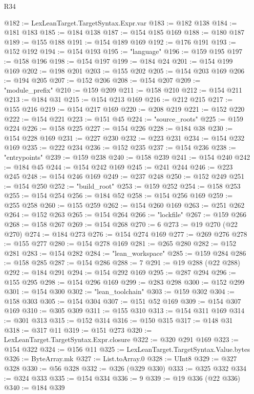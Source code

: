 \begin{lexlean}{R34}
\begin{coremodule}
@182 := LexLeanTarget.TargetSyntax.Expr.var
@183 := @182 @138
@184 := @181 @183
@185 := @184 @138
@187 := @154 @185 @169
@188 := @180 @187
@189 := @155 @188
@191 := @154 @189 @169
@192 := @176 @191
@193 := @152 @192
@194 := @154 @193
@195 := "language"
@196 := @159 @195
@197 := @158 @196
@198 := @154 @197
@199 := @184 @24
@201 := @154 @199 @169
@202 := @198 @201
@203 := @155 @202
@205 := @154 @203 @169
@206 := @194 @205
@207 := @152 @206
@208 := @154 @207
@209 := "module_prefix"
@210 := @159 @209
@211 := @158 @210
@212 := @154 @211
@213 := @184 @31
@215 := @154 @213 @169
@216 := @212 @215
@217 := @155 @216
@219 := @154 @217 @169
@220 := @208 @219
@221 := @152 @220
@222 := @154 @221
@223 := @151 @45
@224 := "source_roots"
@225 := @159 @224
@226 := @158 @225
@227 := @154 @226
@228 := @184 @38
@230 := @154 @228 @169
@231 := @227 @230
@232 := @223 @231
@234 := @154 @232 @169
@235 := @222 @234
@236 := @152 @235
@237 := @154 @236
@238 := "entrypoints"
@239 := @159 @238
@240 := @158 @239
@241 := @154 @240
@242 := @184 @45
@244 := @154 @242 @169
@245 := @241 @244
@246 := @223 @245
@248 := @154 @246 @169
@249 := @237 @248
@250 := @152 @249
@251 := @154 @250
@252 := "build_root"
@253 := @159 @252
@254 := @158 @253
@255 := @154 @254
@256 := @184 @52
@258 := @154 @256 @169
@259 := @255 @258
@260 := @155 @259
@262 := @154 @260 @169
@263 := @251 @262
@264 := @152 @263
@265 := @154 @264
@266 := "lockfile"
@267 := @159 @266
@268 := @158 @267
@269 := @154 @268
@270 := 6
@273 := @19 @270 (@22 @270)
@274 := @184 @273
@276 := @154 @274 @169
@277 := @269 @276
@278 := @155 @277
@280 := @154 @278 @169
@281 := @265 @280
@282 := @152 @281
@283 := @154 @282
@284 := "lean_workspace"
@285 := @159 @284
@286 := @158 @285
@287 := @154 @286
@288 := 7
@291 := @19 @288 (@22 @288)
@292 := @184 @291
@294 := @154 @292 @169
@295 := @287 @294
@296 := @155 @295
@298 := @154 @296 @169
@299 := @283 @298
@300 := @152 @299
@301 := @154 @300
@302 := "lean_toolchain"
@303 := @159 @302
@304 := @158 @303
@305 := @154 @304
@307 := @151 @52 @169
@309 := @154 @307 @169
@310 := @305 @309
@311 := @155 @310
@313 := @154 @311 @169
@314 := @301 @313
@315 := @152 @314
@316 := @150 @315
@317 := @148 @31
@318 := @317 @11
@319 := @151 @273
@320 := LexLeanTarget.TargetSyntax.Expr.closure
@322 := @320 @291 @169
@323 := @154 @322
@324 := @156 @11
@325 := LexLeanTarget.TargetSyntax.Value.bytes
@326 := ByteArray.mk
@327 := List.toArray.{0}
@328 := UInt8
@329 := @327 @328
@330 := @56 @328
@332 := @326 (@329 @330)
@333 := @325 @332
@334 := @324 @333
@335 := @154 @334
@336 := 9
@339 := @19 @336 (@22 @336)
@340 := @184 @339

\end{coremodule}
\end{lexlean}

